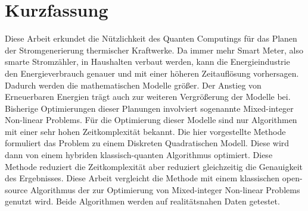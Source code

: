 \section*{Kurzfassung}

Diese Arbeit erkundet die Nützlichkeit des Quanten Computings für das Planen der Stromgenerierung thermischer Kraftwerke.
Da immer mehr Smart Meter, also smarte Stromzähler, in Haushalten verbaut werden, kann die Energieindustrie den Energieverbrauch genauer und mit einer höheren Zeitauflösung vorhersagen.
Dadurch werden die mathematischen Modelle größer.
Der Anstieg von Erneuerbaren Energien trägt auch zur weiteren Vergrößerung der Modelle bei.
Bisherige Optimierungen dieser Planungen involviert sogenannte Mixed-integer Non-linear Problems.
Für die Optimierung dieser Modelle sind nur Algorithmen mit einer sehr hohen Zeitkomplexität bekannt.
Die hier vorgestellte Methode formuliert das Problem zu einem Diskreten Quadratischen Modell.
Diese wird dann von einem hybriden klassisch-quanten Algorithmus optimiert.
Diese Methode reduziert die Zeitkomplexität aber reduziert gleichzeitig die Genauigkeit des Ergebnisses.
Diese Arbeit vergleicht die Methode mit einem klassischen open-source Algorithmus der zur Optimierung von Mixed-integer Non-linear Problems genutzt wird.
Beide Algorithmen werden auf realitätsnahen Daten getestet.
